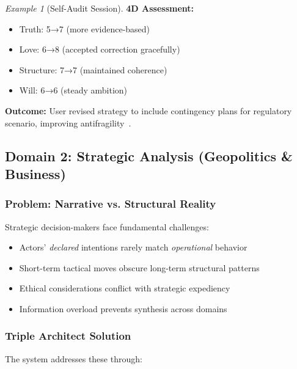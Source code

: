 \documentclass[11pt,a4paper]{article}
\theoremstyle{definition}
\theoremstyle{remark}
\newtheorem{example}{Example}[section]
\begin{document}
\begin{example}[Self-Audit Session]
\textbf{4D Assessment:}
\begin{itemize}
    \item Truth: 5→7 (more evidence-based)
    \item Love: 6→8 (accepted correction gracefully)
    \item Structure: 7→7 (maintained coherence)
    \item Will: 6→6 (steady ambition)
\end{itemize}

\textbf{Outcome:} User revised strategy to include contingency plans for regulatory scenario, improving antifragility~\citep{taleb2012antifragile}.
\end{example}

\subsection{Domain 2: Strategic Analysis (Geopolitics \& Business)}

\subsubsection{Problem: Narrative vs. Structural Reality}

Strategic decision-makers face fundamental challenges:
\begin{itemize}
    \item Actors' \textit{declared} intentions rarely match \textit{operational} behavior
    \item Short-term tactical moves obscure long-term structural patterns
    \item Ethical considerations conflict with strategic expediency
    \item Information overload prevents synthesis across domains
\end{itemize}

\subsubsection{Triple Architect Solution}

The system addresses these through:
\end{document}
